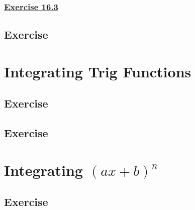 \documentclass[
  11pt,
  openany]{book}
\begin{document}
\vspace{-1cm}

\label{ex163q}{}

\subsubsection*{\texorpdfstring{\hyperref[ex163a]{Exercise 16.3}}{Exercise 16.3}}\label{exercise-16.3}

\vspace{-0.5cm}

\newpage

\subsection*{Exercise}\label{exercise-45}

\newpage

\section{Integrating Trig Functions}\label{integrating-trig-functions}

\newpage

\subsection*{Exercise}\label{exercise-46}

\newpage

\subsection*{Exercise}\label{exercise-47}

\newpage

\section{\texorpdfstring{Integrating \((ax+b)^n\)}{Integrating (ax+b)\^{}n}}\label{integrating-axbn}

\newpage

\subsection*{Exercise}\label{exercise-48}
\end{document}
